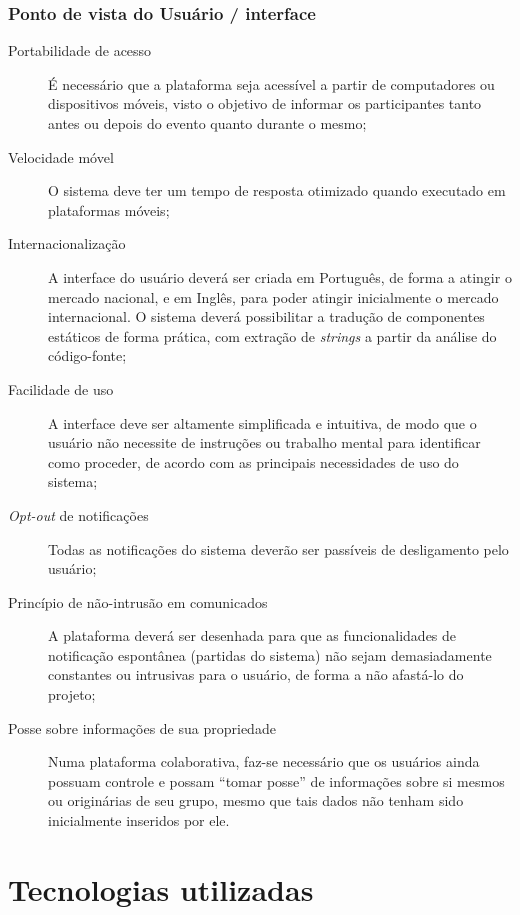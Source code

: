 \documentclass[12pt,a4paper,twoside,hyphens,english,brazil]{abntex2}
\begin{document}
\subsubsection*{Ponto de vista do Usuário / interface}
\begin{description}
	\item[Portabilidade de acesso]
		É necessário que a plataforma seja acessível a partir de computadores ou dispositivos móveis, visto o objetivo de informar os participantes tanto antes ou depois do evento quanto durante o mesmo;
	\item[Velocidade móvel]
		O sistema deve ter um tempo de resposta otimizado quando executado em plataformas móveis;
	\item[Internacionalização]
		A interface do usuário deverá ser criada em Português, de forma a atingir o mercado nacional, e em Inglês, para poder atingir inicialmente o mercado internacional. O sistema deverá possibilitar a tradução de componentes estáticos de forma prática, com extração de \emph{strings} a partir da análise do código-fonte;
	\item[Facilidade de uso]
		A interface deve ser altamente simplificada e intuitiva, de modo que o usuário não necessite de instruções ou trabalho mental para identificar como proceder, de acordo com as principais necessidades de uso do sistema;
	\item[\emph{Opt-out} de notificações]
		Todas as notificações do sistema deverão ser passíveis de desligamento pelo usuário;
	\item[Princípio de não-intrusão em comunicados]
		A plataforma deverá ser desenhada para que as funcionalidades de notificação espontânea (partidas do sistema) não sejam demasiadamente constantes ou intrusivas para o usuário, de forma a não afastá-lo do projeto;
	\item[Posse sobre informações de sua propriedade]
		Numa plataforma colaborativa, faz-se necessário que os usuários ainda possuam controle e possam ``tomar posse'' de informações sobre si mesmos ou originárias de seu grupo, mesmo que tais dados não tenham sido inicialmente inseridos por ele.
\end{description}


\section{Tecnologias utilizadas} \label{sec:tecnologias}
\end{document}
